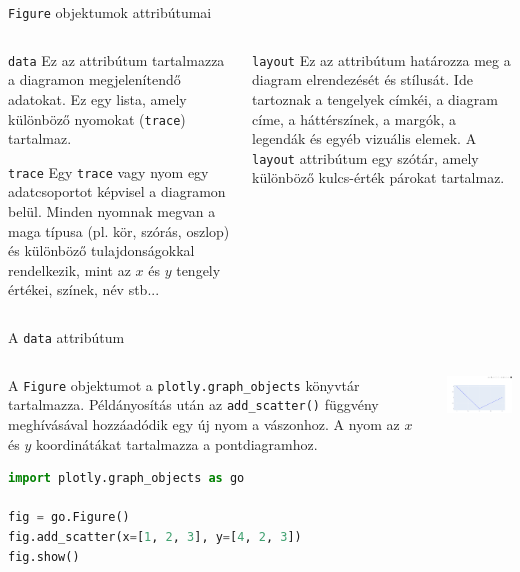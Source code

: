 \documentclass[english, aspectratio=169]{beamer}
\begin{document}
\begin{frame}{\texttt{Figure} objektumok attribútumai}
	\begin{columns}
		\begin{column}{.5\textwidth}
			\begin{block}{\texttt{data}}
				 Ez az attribútum tartalmazza a diagramon megjelenítendő adatokat. Ez egy lista, amely különböző nyomokat (\texttt{trace}) tartalmaz.
			\end{block}
			\vspace{.3cm}
			\begin{block}{\texttt{trace}}
				Egy \texttt{trace} vagy nyom egy adatcsoportot képvisel a diagramon belül. Minden nyomnak megvan a maga típusa (pl. kör, szórás, oszlop) és különböző tulajdonságokkal rendelkezik, mint az $x$ és $y$ tengely értékei, színek, név stb...
			\end{block}
		\end{column}
		\begin{column}{.5\textwidth}
			\begin{block}{\texttt{layout}}
				Ez az attribútum határozza meg a diagram elrendezését és stílusát. Ide tartoznak a tengelyek címkéi, a diagram címe, a háttérszínek, a margók, a legendák és egyéb vizuális elemek. A \texttt{layout} attribútum egy szótár, amely különböző kulcs-érték párokat tartalmaz.
			\end{block}
		\end{column}
	\end{columns}
\end{frame}

\begin{frame}[fragile]{A \texttt{data} attribútum}
	\begin{columns}
		\begin{column}{.6\textwidth}
			A \texttt{Figure} objektumot a \texttt{plotly.graph\_objects} könyvtár tartalmazza. Példányosítás után az \texttt{add\_scatter()} függvény meghívásával hozzáadódik egy új nyom a vászonhoz. A nyom az $x$ és $y$ koordinátákat tartalmazza a pontdiagramhoz. 
			\vspace*{0.3cm}
			\begin{lstlisting}[language=python]
import plotly.graph_objects as go

fig = go.Figure()
fig.add_scatter(x=[1, 2, 3], y=[4, 2, 3])
fig.show()
			\end{lstlisting}		
		\end{column}
		\begin{column}{.4\textwidth}
			\begin{center}
				\includegraphics[width=6cm, keepaspectratio]{images/plots_2.png}
			\end{center}
		\end{column}
	\end{columns}
\end{frame}
\end{document}
